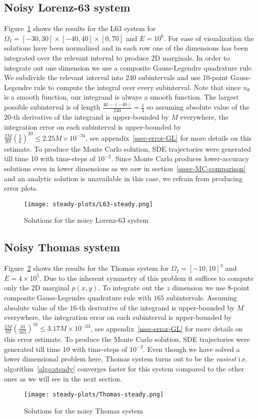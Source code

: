 \subsection{Noisy Lorenz-63 system} Figure~\ref{fig:L63-steady} shows the results for the L63 system for $\Omega_I = [-30, 30]\times[-40, 40]\times[0, 70]$ and $E=10^6$. For ease of visualization the solutions have been normalized and in each row one of the dimensions has been integrated over the relevant interval to produce 2D marginals. In order to integrate out one dimension we use a composite Gauss-Legendre quadrature rule. We subdivide the relevant interval into 240 subintervals and use 10-point Gauss-Legendre rule to compute the integral over every subinterval. Note that since $n_\theta$ is a smooth function, our integrand is always a smooth function. The largest possible subinterval is of length $\frac{40-(-40)}{240}=\frac{1}{3}$ so assuming absolute value of the $20$-th derivative of the integrand is upper-bounded by $M$ everywhere, the integration error on each subinterval is upper-bounded by $\frac{2M}{20!}\left(\frac{1}{6}\right)^{20}\le2.25M\times10^{-34}$, see appendix~\ref{ssec-error-GL} for more details on this estimate. To produce the Monte Carlo solution, SDE trajectories were generated till time 10 with time-steps of $10^{-2}$. 
Since Monte Carlo produces lower-accuracy solutions even in lower dimensions as we saw in section~\ref{sssec-MC-comparison} and an analytic solution is unavailable in this case, we refrain from producing error plots.

\begin{figure}[!ht]
    \centering\texttt{[image: steady-plots/L63-steady.png]}  \caption{Solutions for the noisy Lorenz-63 system}
    \label{fig:L63-steady}
\end{figure}

\subsection{Noisy Thomas system}
Figure~\ref{fig:Thomas-steady} shows the results for the Thomas system for $\Omega_I = [-10, 10]^3$ and $E=4\times10^5$. Due to the inherent symmetry of this problem it suffices to compute only the 2D marginal $p(x, y)$. To integrate out the $z$ dimension we use 8-point composite Gauss-Legendre quadrature rule with $165$ subintervals. Assuming absolute value of the $16$-th derivative of the integrand is upper-bounded by $M$ everywhere, the integration error on each subinterval is upper-bounded by $\frac{2M}{16!}\left(\frac{10}{165}\right)^{16}\le3.17M\times10^{-33}$, see appendix~\ref{ssec-error-GL} for more details on this error estimate. To produce the Monte Carlo solution, SDE trajectories were generated till time 10 with time-steps of $10^{-2}$. Even though we have solved a lower dimensional problem here, Thomas system turns out to be the \textit{easiest} i.e. algorithm~\ref{algo:steady} converges faster for this system compared to the other ones as we will see in the next section.
\begin{figure}[!htp]
    \centering\texttt{[image: steady-plots/Thomas-steady.png]}
    \caption{Solutions for the noisy Thomas system}
    \label{fig:Thomas-steady}
\end{figure}
